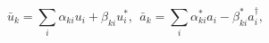 \begin{equation} \label{b transformation}
\bar{u} _k = \sum_i \alpha _{ki} u_i + \beta _{ki} u_i ^* , \ \ \bar{a}_k = \sum_i \alpha ^* _{ki} a_i - \beta ^* _{ki} a_i ^\dagger ,
\end{equation}

